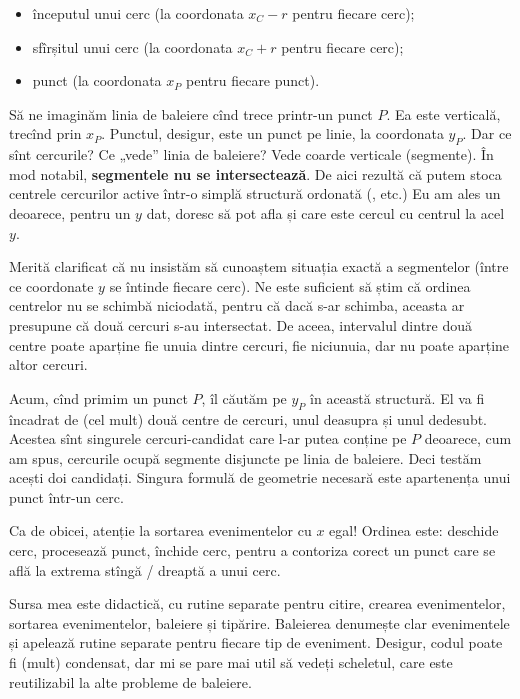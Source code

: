 \documentclass[../main.tex]{subfiles}
\begin{document}
\begin{itemize}
  \item începutul unui cerc (la coordonata $x_C - r$ pentru fiecare cerc);
  \item sfîrșitul unui cerc (la coordonata $x_C + r$ pentru fiecare cerc);
  \item punct (la coordonata $x_P$ pentru fiecare punct).
\end{itemize}

Să ne imaginăm linia de baleiere cînd trece printr-un punct $P$. Ea este verticală, trecînd prin $x_P$. Punctul, desigur, este un punct pe linie, la coordonata $y_P$. Dar ce sînt cercurile? Ce „vede” linia de baleiere? Vede coarde verticale (segmente). În mod notabil, \textbf{segmentele nu se intersectează}. De aici rezultă că putem stoca centrele cercurilor active într-o simplă structură ordonată (,  etc.) Eu am ales un  deoarece, pentru un $y$ dat, doresc să pot afla și care este cercul cu centrul la acel $y$.

Merită clarificat că nu insistăm să cunoaștem situația exactă a segmentelor (între ce coordonate $y$ se întinde fiecare cerc). Ne este suficient să știm că ordinea centrelor nu se schimbă niciodată, pentru că dacă s-ar schimba, aceasta ar presupune că două cercuri s-au intersectat. De aceea, intervalul dintre două centre poate aparține fie unuia dintre cercuri, fie niciunuia, dar nu poate aparține altor cercuri.

Acum, cînd primim un punct $P$, îl căutăm pe $y_P$ în această structură. El va fi încadrat de (cel mult) două centre de cercuri, unul deasupra și unul dedesubt. Acestea sînt singurele cercuri-candidat care l-ar putea conține pe $P$ deoarece, cum am spus, cercurile ocupă segmente disjuncte pe linia de baleiere. Deci testăm acești doi candidați. Singura formulă de geometrie necesară este apartenența unui punct într-un cerc.

Ca de obicei, atenție la sortarea evenimentelor cu $x$ egal! Ordinea este: deschide cerc, procesează punct, închide cerc, pentru a contoriza corect un punct care se află la extrema stîngă / dreaptă a unui cerc.

Sursa mea este didactică, cu rutine separate pentru citire, crearea evenimentelor, sortarea evenimentelor, baleiere și tipărire. Baleierea denumește clar evenimentele și apelează rutine separate pentru fiecare tip de eveniment. Desigur, codul poate fi (mult) condensat, dar mi se pare mai util să vedeți scheletul, care este reutilizabil la alte probleme de baleiere.
\end{document}
